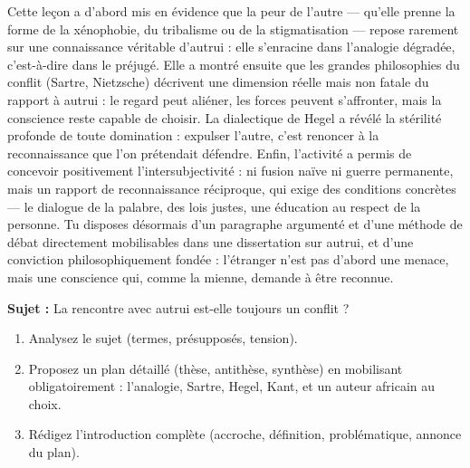 \documentclass[11pt]{article}
\newcommand{\cle}[1]{{\popxbold\color{popdark}#1}}
\begin{document}
Cette leçon a d'abord mis en évidence que la \cle{peur de l'autre} — qu'elle prenne la forme de la xénophobie, du tribalisme ou de la stigmatisation — repose rarement sur une connaissance véritable d'autrui : elle s'enracine dans l'analogie dégradée, c'est-à-dire dans le préjugé. Elle a montré ensuite que les grandes philosophies du conflit (Sartre, Nietzsche) décrivent une dimension réelle mais non fatale du rapport à autrui : le regard peut aliéner, les forces peuvent s'affronter, mais la conscience reste capable de choisir. La dialectique de Hegel a révélé la stérilité profonde de toute domination : expulser l'autre, c'est renoncer à la reconnaissance que l'on prétendait défendre. Enfin, l'activité a permis de concevoir positivement l'\cle{intersubjectivité} : ni fusion naïve ni guerre permanente, mais un rapport de reconnaissance réciproque, qui exige des conditions concrètes — le dialogue de la palabre, des lois justes, une éducation au respect de la personne. Tu disposes désormais d'un paragraphe argumenté et d'une méthode de débat directement mobilisables dans une dissertation sur autrui, et d'une conviction philosophiquement fondée : l'étranger n'est pas d'abord une menace, mais une conscience qui, comme la mienne, demande à être reconnue.

\begin{exercice}
\textbf{Sujet :} \guillemotleft La rencontre avec autrui est-elle toujours un conflit ? \guillemotright
\begin{enumerate}
\item Analysez le sujet (termes, présupposés, tension).
\item Proposez un plan détaillé (thèse, antithèse, synthèse) en mobilisant obligatoirement : l'analogie, Sartre, Hegel, Kant, et un auteur africain au choix.
\item Rédigez l'introduction complète (accroche, définition, problématique, annonce du plan).
\end{enumerate}
\end{exercice}
\end{document}
